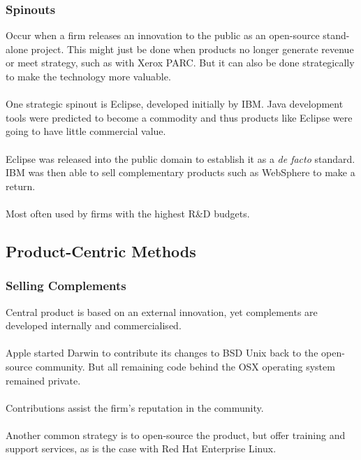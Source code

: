 \documentclass{beamer}
\begin{document}

\begin{frame}
\frametitle{Spinouts}
Occur when a firm releases an innovation to the public as an open-source stand-alone project. This might just be done when products no longer generate revenue or meet strategy, such as with Xerox PARC. But it can also be done strategically to make the technology more valuable.\\~\\

One strategic spinout is Eclipse, developed initially by IBM. Java development tools were predicted to become a commodity and thus products like Eclipse were going to have little commercial value.\\~\\

Eclipse was released into the public domain to establish it as a \textit{de facto} standard. IBM was then able to sell complementary products such as WebSphere to make a return.\\~\\

Most often used by firms with the highest R\&D budgets.
\end{frame}

\subsection{Product-Centric Methods}

\begin{frame}
\frametitle{Selling Complements}
Central product is based on an external innovation, yet complements are developed internally and commercialised.\\~\\

Apple started Darwin to contribute its changes to BSD Unix back to the open-source community. But all remaining code behind the OSX operating system remained private.\\~\\

Contributions assist the firm's reputation in the community.\\~\\

Another common strategy is to open-source the product, but offer training and support services, as is the case with Red Hat Enterprise Linux.
\end{frame}
\end{document}
